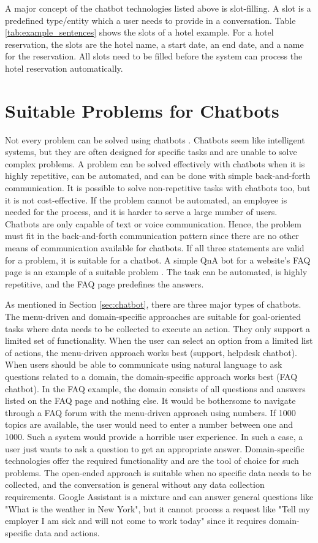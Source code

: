 A major concept of the chatbot technologies listed above is slot-filling.
A slot is a predefined type/entity which a user needs to provide in a conversation.
Table \ref{tab:example_sentences} shows the slots of a hotel example.
For a hotel reservation, the slots are the hotel name, a start date, an end date, and a name for the reservation.
All slots need to be filled before the system can process the hotel reservation automatically.

\section{Suitable Problems for Chatbots} 
Not every problem can be solved using chatbots \cite{buiildChatbotsPython}.
Chatbots seem like intelligent systems, but they are often designed for specific tasks and are unable to solve complex problems.
A problem can be solved effectively with chatbots when it is highly repetitive, can be automated, and can be done with simple back-and-forth communication.
It is possible to solve non-repetitive tasks with chatbots too, but it is not cost-effective.
If the problem cannot be automated, an employee is needed for the process, and it is harder to serve a large number of users.
Chatbots are only capable of text or voice communication.
Hence, the problem must fit in the back-and-forth communication pattern since there are no other means of communication available for chatbots.
If all three statements are valid for a problem, it is suitable for a chatbot.
A simple QnA bot for a website's FAQ page is an example of a suitable problem \cite{buiildChatbotsPython}.
The task can be automated, is highly repetitive, and the FAQ page predefines the answers.

As mentioned in Section \ref{sec:chatbot}, there are three major types of chatbots.
The menu-driven and domain-specific approaches are suitable for goal-oriented tasks where data needs to be collected to execute an action. 
They only support a limited set of functionality.
When the user can select an option from a limited list of actions, the menu-driven approach works best (support, helpdesk chatbot).
When users should be able to communicate using natural language to ask questions related to a domain, the domain-specific approach works best (FAQ chatbot).
In the FAQ example, the domain consists of all questions and answers listed on the FAQ page and nothing else.
It would be bothersome to navigate through a FAQ forum with the menu-driven approach using numbers.
If 1000 topics are available, the user would need to enter a number between one and 1000.
Such a system would provide a horrible user experience.
In such a case, a user just wants to ask a question to get an appropriate answer.
Domain-specific technologies offer the required functionality and are the tool of choice for such problems.
The open-ended approach is suitable when no specific data needs to be collected, and the conversation is general without any data collection requirements. 
Google Assistant is a mixture and can answer general questions like "What is the weather in New York", but it cannot process a request like "Tell my employer I am sick and will not come to work today" since it requires domain-specific data and actions.

